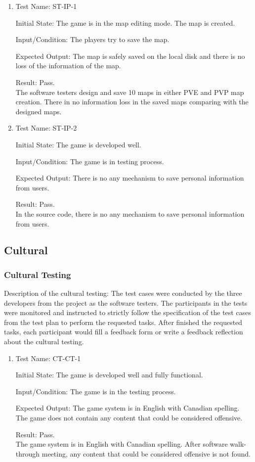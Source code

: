 \documentclass[12pt, titlepage]{article}
\begin{document}
\begin{enumerate}

\item{Test Name: ST-IP-1\\}

Initial State: The game is in the map editing mode. The map is created.

Input/Condition: The players try to save the map.

Expected Output: The map is safely saved on the local disk and there is no loss of the information of the map.

Result: Pass. \\The software testers design and save 10 maps in either PVE and PVP map creation. There in no information loss in the saved maps comparing with the designed maps.

\item{Test Name: ST-IP-2\\}

Initial State: The game is developed well.

Input/Condition: The game is in testing process.

Expected Output: There is no any mechanism to save personal information from users.

Result: Pass. \\In the source code, there is no any mechanism to save personal information from users.

\end{enumerate}
\subsection{Cultural}
\subsubsection{Cultural Testing}
Description of the cultural testing: The test cases were conducted by the three developers from the project as the software testers. The participants in the tests were monitored and instructed to strictly follow the specification of the test cases from the test plan to perform the requested tasks. After finished the requested tasks, each participant would fill a feedback form or write a feedback reflection about the cultural testing.

\begin{enumerate}

\item{Test Name: CT-CT-1\\}

Initial State: The game is developed well and fully functional.

Input/Condition: The game is in the testing process.

Expected Output: The game system is in English with Canadian spelling. The game does not contain any content that could be considered offensive.

Result: Pass. \\The game system is in English with Canadian spelling. After software walk-through meeting, any content that could be considered offensive is not found.

\end{enumerate}
	
\end{document}
